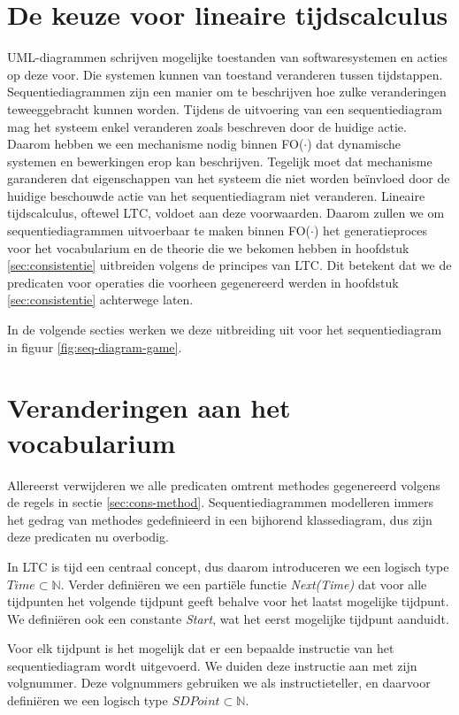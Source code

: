 \section{De keuze voor lineaire tijdscalculus}
UML-diagrammen schrijven mogelijke toestanden van softwaresystemen en acties op deze voor. Die systemen kunnen van toestand veranderen tussen tijdstappen. Sequentiediagrammen zijn een manier om te beschrijven hoe zulke veranderingen teweeggebracht kunnen worden. Tijdens de uitvoering van een sequentiediagram mag het systeem enkel veranderen zoals beschreven door de huidige actie. Daarom hebben we een mechanisme nodig binnen FO($\cdot$) dat dynamische systemen en bewerkingen erop kan beschrijven. Tegelijk moet dat mechanisme garanderen dat eigenschappen van het systeem die niet worden be\"invloed door de huidige beschouwde actie van het sequentiediagram niet veranderen. Lineaire tijdscalculus\cite{BogaertsBart2014Sdsu}, oftewel LTC, voldoet aan deze voorwaarden. Daarom zullen we om sequentiediagrammen uitvoerbaar te maken binnen FO($\cdot$) het generatieproces voor het vocabularium en de theorie die we bekomen hebben in hoofdstuk \ref{sec:consistentie} uitbreiden volgens de principes van LTC. Dit betekent dat we de predicaten voor operaties die voorheen gegenereerd werden in hoofdstuk \ref{sec:consistentie} achterwege laten.

In de volgende secties werken we deze uitbreiding uit voor het sequentiediagram in figuur \ref{fig:seq-diagram-game}.

\section{Veranderingen aan het vocabularium}
Allereerst verwijderen we alle predicaten omtrent methodes gegenereerd volgens de regels in sectie \ref{sec:cons-method}. Sequentiediagrammen modelleren immers het gedrag van methodes gedefinieerd in een bijhorend klassediagram, dus zijn deze predicaten nu overbodig.

In LTC is tijd een centraal concept, dus daarom introduceren we een logisch type $Time \subset \mathbb{N}$. Verder defini\"eren we een parti\"ele functie \textit{Next(Time)} dat voor alle tijdpunten het volgende tijdpunt geeft behalve voor het laatst mogelijke tijdpunt. We defini\"eren ook een constante \textit{Start}, wat het eerst mogelijke tijdpunt aanduidt.

Voor elk tijdpunt is het mogelijk dat er een bepaalde instructie van het sequentiediagram wordt uitgevoerd. We duiden deze instructie aan met zijn volgnummer.
Deze volgnummers gebruiken we als instructieteller, en daarvoor defini\"eren we een logisch type $SDPoint \subset \mathbb{N}$.

